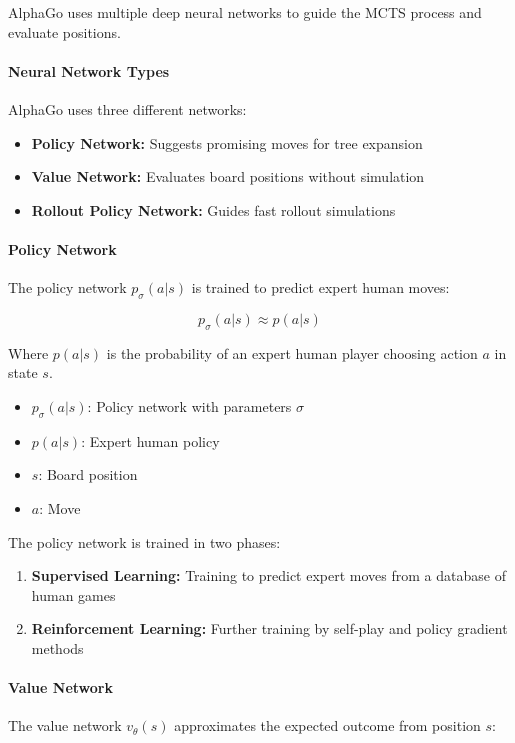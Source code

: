 \documentclass[11pt]{article}
\begin{document}
AlphaGo uses multiple deep neural networks to guide the MCTS process and evaluate positions.

\paragraph{Neural Network Types}
AlphaGo uses three different networks:
\begin{itemize}
    \item \textbf{Policy Network:} Suggests promising moves for tree expansion
    \item \textbf{Value Network:} Evaluates board positions without simulation
    \item \textbf{Rollout Policy Network:} Guides fast rollout simulations
\end{itemize}

\paragraph{Policy Network}
The policy network $p_\sigma(a|s)$ is trained to predict expert human moves:

\begin{equation}
    p_\sigma(a|s) \approx p(a|s)
\end{equation}

Where $p(a|s)$ is the probability of an expert human player choosing action $a$ in state $s$.

\begin{tcolorbox}[title=Notation Overview]
\begin{itemize}
    \item $p_\sigma(a|s)$: Policy network with parameters $\sigma$
    \item $p(a|s)$: Expert human policy
    \item $s$: Board position
    \item $a$: Move
\end{itemize}
\end{tcolorbox}

The policy network is trained in two phases:
\begin{enumerate}
    \item \textbf{Supervised Learning:} Training to predict expert moves from a database of human games
    \item \textbf{Reinforcement Learning:} Further training by self-play and policy gradient methods
\end{enumerate}

\paragraph{Value Network}
The value network $v_\theta(s)$ approximates the expected outcome from position $s$:
\end{document}
